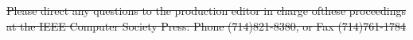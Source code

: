 \documentclass[10pt,twocolumn,letterpaper]{article}
\providecommand{\DIFaddtex}[1]{{\protect\color{blue}\uwave{#1}}} %
\providecommand{\DIFdeltex}[1]{{\protect\color{red}\sout{#1}}}                      %
\providecommand{\DIFaddbegin}{} %
\providecommand{\DIFdelend}{} %
\providecommand{\DIFadd}[1]{\texorpdfstring{\DIFaddtex{#1}}{#1}} %
\providecommand{\DIFdel}[1]{\texorpdfstring{\DIFdeltex{#1}}{}} %
\begin{document}
\DIFdel{Please direct any questions to the production editor in charge ofthese
proceedings at the IEEE Computer Society Press: Phone (714)821-8380, or
Fax (714)761-1784}\DIFdelend %
\end{document}
